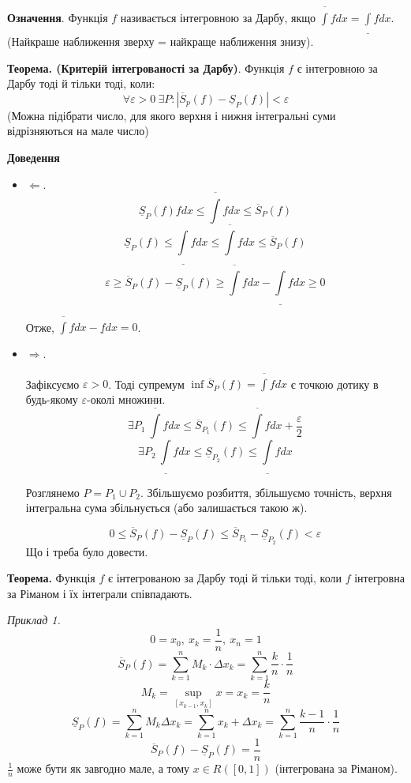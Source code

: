 \documentclass[12pt]{report}
\begin{document}
	\textbf{Означення}. Функція $f$ називається інтегровною за Дарбу, якщо $\overline \int f dx = \underline \int fdx$. (Найкраше наближення зверху = найкраще наближення знизу).
	
	\textbf{Теорема. (Критерій інтегрованості за Дарбу)}. Функція $f$ є інтегровною за Дарбу тоді й тільки тоді, коли:
	$$\forall \varepsilon > 0 \ \exists P : |\overline S_{p}(f) - \underline S_{P} (f)| < \varepsilon$$
	(Можна підібрати число, для якого верхня і нижня інтегральні суми відрізняються на мале число)
	
	\textbf{Доведення}
	
	\begin{itemize}
		\item $\Longleftarrow.$
		$$\underline S_{P} (f) fdx \leq \overline \int fdx \leq \overline S_{P} (f)$$ 
		$$\underline S_{P} (f) \leq \underline \int fdx \leq \overline \int f dx \leq \overline S_{P} (f)$$
		$$\varepsilon \geq \overline S_{P} (f) - \underline S_{P} (f) \geq \overline \int f dx - \underline \int f dx \geq 0$$
		
		Отже, $\overline \int f dx - \underline f dx = 0$.
		
		\item $\Longrightarrow.$
		
		Зафіксуємо $\varepsilon > 0$. Тоді супремум $\inf \overline S_{P} (f) = \overline \int f dx$ є точкою дотику 
		в будь-якому $\varepsilon$-околі множини.
		$$\exists P_{1} \ \overline \int f dx \leq \overline S_{P_1} (f) \leq \overline \int fdx + \frac{\varepsilon}{2}$$
		$$\exists P_{2} \ \underline \int f dx \leq \underline S_{P_2} (f) \leq \underline \int fdx $$
		
		Розглянемо $P = P_1 \cup P_2$. Збільшуємо розбиття, збільшуємо точність, верхня інтегральна сума збільнується (або залишається такою ж).
		
		$$0 \leq \overline S_{P} (f) - \underline S_{P} (f) \leq \overline S_{P_1} - \underline S_{P_2} (f) < \varepsilon$$
		Що і треба було довести.
	\end{itemize}
	
	\vspace{5mm}
	
	\textbf{Теорема.} Функція $f$ є інтегрованою за Дарбу тоді й тільки тоді, коли $f$ інтегровна за Ріманом і їх інтеграли співпадають.
	
	\vspace{3mm}
	
	\textit{Приклад 1.}
	$$0 = x_0,\ x_k = \frac{1}{n},\ x_n = 1$$
	$$\overline S_{P} (f) = \sum_{k=1}^n M_k \cdot \Delta x_k = \sum_{k=1}^n \frac{k}{n} \cdot \frac{1}{n}$$
	$$M_k = \sup_{[x_{k-1}, x_k]} x = x_k = \frac{k}{n}$$
	$$\underline S_{P} (f) = \sum_{k = 1}^n M_k \Delta x_k = \sum_{k=1}^n x_k + \Delta x_k = \sum_{k=1}^{n} \frac{k-1}{n} \cdot \frac{1}{n}$$
	$$\overline S_{P}(f) - \underline S_{P} (f) = \frac{1}{n}$$
	$\frac{1}{n}$ може бути як завгодно мале, а тому $x \in R([0,1])$ (інтегрована за Ріманом).
	\vspace{3mm}
	
\end{document}
